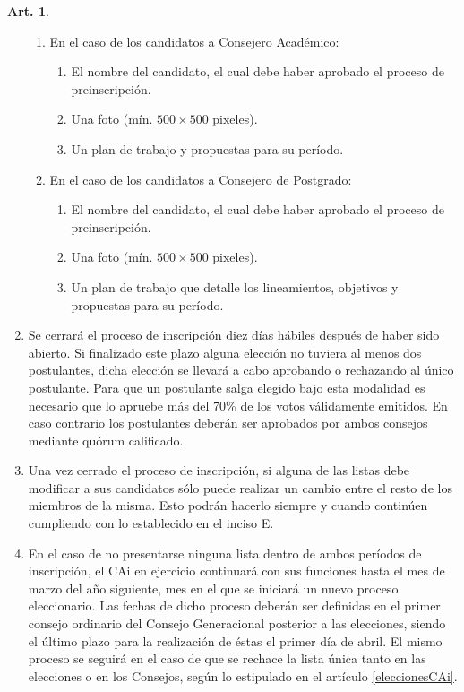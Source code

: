 \documentclass[letterpaper,11pt]{article}
\theoremstyle{definition}%
\newtheorem{art}{Art.} %
\begin{document}
\begin{art}
\begin{enumerate}
\begin{enumerate}
			      \item En el caso de los candidatos a Consejero Académico:
			            \begin{enumerate}
				            \item El nombre del candidato, el cual debe haber aprobado el proceso de preinscripción.
				            \item\label{foto} Una foto (mín. $500 \times 500$ pixeles).
				            \item Un plan de trabajo y propuestas para su período.
			            \end{enumerate}

			      \item En el caso de los candidatos a Consejero de Postgrado:
			            \begin{enumerate}
				            \item El nombre del candidato, el cual debe haber aprobado el proceso de preinscripción.
				            \item\label{foto} Una foto (mín. $500 \times 500$ pixeles).
				            \item Un plan de trabajo que detalle los lineamientos, objetivos y propuestas para su período.
			            \end{enumerate}
		      \end{enumerate}

		\item\label{cierre}Se cerrará el proceso de inscripción diez días hábiles después de haber sido abierto. Si finalizado este plazo alguna elección no tuviera al menos dos postulantes, dicha elección se llevará a cabo aprobando o rechazando al único postulante. Para que un postulante salga elegido bajo esta modalidad es necesario que lo apruebe más del 70\% de los votos válidamente emitidos. En caso contrario los postulantes deberán ser aprobados por ambos consejos mediante quórum calificado.

		\item Una vez cerrado el proceso de inscripción, si alguna de las listas debe modificar a sus candidatos sólo puede realizar un cambio entre el resto de los miembros de la misma. Esto podrán hacerlo siempre y cuando continúen cumpliendo con lo establecido en el inciso E.

		\item En el caso de no presentarse ninguna lista dentro de ambos períodos de inscripción, el CAi en ejercicio continuará con sus funciones hasta el mes de marzo del año siguiente, mes en el que se iniciará un nuevo proceso eleccionario. Las fechas de dicho proceso deberán ser definidas en  el primer consejo ordinario del Consejo Generacional posterior a las elecciones, siendo el último plazo para la realización de éstas el primer día de abril. El mismo proceso se seguirá en el caso de que se rechace la lista única tanto en las elecciones o en los Consejos, según lo estipulado en el artículo \ref{eleccionesCAi}.


\end{enumerate}
\end{art}
\end{document}
